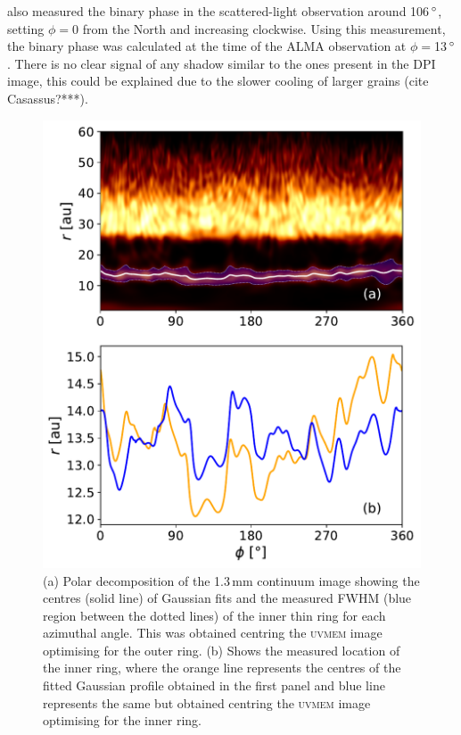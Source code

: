 \documentclass[letters,usenatbib,times]{mnras}
\begin{document}
\citet{dOrazi} also measured the binary phase in the scattered-light observation around 106\,$\hbox{$^\circ$}$, setting $\phi=$0 from the North and increasing clockwise. Using this measurement, the binary phase was calculated at the time of the ALMA observation at $\phi=$13\,$\hbox{$^\circ$}$. There is no clear signal of any shadow similar to the ones present in the DPI image, this could be explained due to the slower cooling of larger grains (cite Casassus?***).

\begin{figure}
    \includegraphics[width=\columnwidth]{polar_ring_aprox_and_diff_inner.pdf}
    \caption{(a) Polar decomposition of the 1.3\,mm continuum image showing the centres (solid line) of Gaussian fits and the measured FWHM (blue region between the dotted lines) of the inner thin ring for each azimuthal angle. This was obtained centring the \textsc{uvmem} image optimising for the outer ring. (b) Shows the measured location of the inner ring, where the orange line represents the centres of the fitted Gaussian profile obtained in the first panel and blue line represents the same but obtained centring the \textsc{uvmem} image optimising for the inner ring.}
    \label{fig:polarring}
\end{figure}
\end{document}
